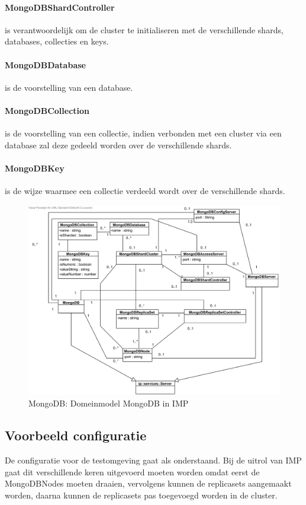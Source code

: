 \documentclass[]{article}
\begin{document}
	\paragraph{MongoDBShardController} is verantwoordelijk om de cluster te initialiseren met de verschillende shards, databases, collecties en keys. 
	\paragraph{MongoDBDatabase} is de voorstelling van een database.
	\paragraph{MongoDBCollection} is de voorstelling van een collectie, indien verbonden met een cluster via een database zal deze gedeeld worden over de verschillende shards. 
	\paragraph{MongoDBKey} is de wijze waarmee een collectie verdeeld wordt over de verschillende shards. 

\begin{figure}[ht!]
\centering
\includegraphics[width=\linewidth]{img/MongoDB-Domeinmodel.png}
\caption{MongoDB: Domeinmodel MongoDB in IMP}
\label{fig:imp-mongodb-domeinmodel}
\end{figure}

\subsection{Voorbeeld configuratie}
De configuratie voor de testomgeving gaat als onderstaand. Bij de uitrol van IMP gaat dit verschillende keren uitgevoerd moeten worden omdat eerst de MongoDBNodes moeten draaien, vervolgens kunnen de replicasets aangemaakt worden, daarna kunnen de replicasets pas toegevoegd worden in de cluster. 
\end{document}
